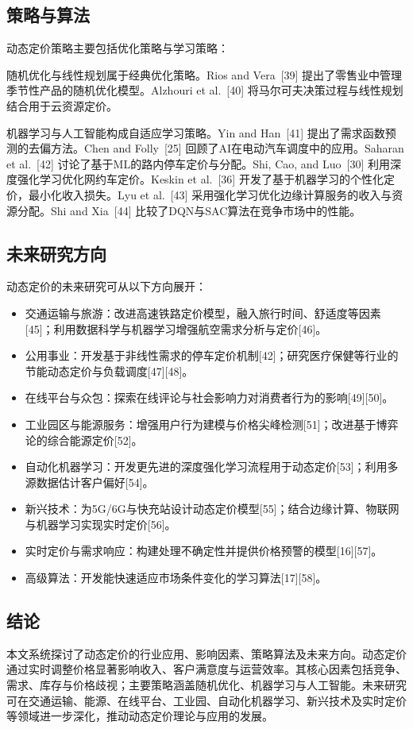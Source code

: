 \subsection{策略与算法}\label{vii.-strategies-and-algorithm}

动态定价策略主要包括优化策略与学习策略：

随机优化与线性规划属于经典优化策略。Rios and Vera~[39] 提出了零售业中管理季节性产品的随机优化模型。Alzhouri et al.~[40] 将马尔可夫决策过程与线性规划结合用于云资源定价。

机器学习与人工智能构成自适应学习策略。Yin and Han~[41] 提出了需求函数预测的去偏方法。Chen and Folly~[25] 回顾了AI在电动汽车调度中的应用。Saharan et al.~[42] 讨论了基于ML的路内停车定价与分配。Shi, Cao, and Luo~[30] 利用深度强化学习优化网约车定价。Keskin et al.~[36] 开发了基于机器学习的个性化定价，最小化收入损失。Lyu et al.~[43] 采用强化学习优化边缘计算服务的收入与资源分配。Shi and Xia~[44] 比较了DQN与SAC算法在竞争市场中的性能。

\subsection{未来研究方向}\label{viii.-potential-future-work}

动态定价的未来研究可从以下方向展开：

\begin{itemize}
	\item 交通运输与旅游：改进高速铁路定价模型，融入旅行时间、舒适度等因素[45]；利用数据科学与机器学习增强航空需求分析与定价[46]。
	\item 公用事业：开发基于非线性需求的停车定价机制[42]；研究医疗保健等行业的节能动态定价与负载调度[47][48]。
	\item 在线平台与众包：探索在线评论与社会影响力对消费者行为的影响[49][50]。
	\item 工业园区与能源服务：增强用户行为建模与价格尖峰检测[51]；改进基于博弈论的综合能源定价[52]。
	\item 自动化机器学习：开发更先进的深度强化学习流程用于动态定价[53]；利用多源数据估计客户偏好[54]。
	\item 新兴技术：为5G/6G与快充站设计动态定价模型[55]；结合边缘计算、物联网与机器学习实现实时定价[56]。
	\item 实时定价与需求响应：构建处理不确定性并提供价格预警的模型[16][57]。
	\item 高级算法：开发能快速适应市场条件变化的学习算法[17][58]。
\end{itemize}

\subsection{结论}\label{ix.-conclusion}

本文系统探讨了动态定价的行业应用、影响因素、策略算法及未来方向。动态定价通过实时调整价格显著影响收入、客户满意度与运营效率。其核心因素包括竞争、需求、库存与价格歧视；主要策略涵盖随机优化、机器学习与人工智能。未来研究可在交通运输、能源、在线平台、工业园、自动化机器学习、新兴技术及实时定价等领域进一步深化，推动动态定价理论与应用的发展。
